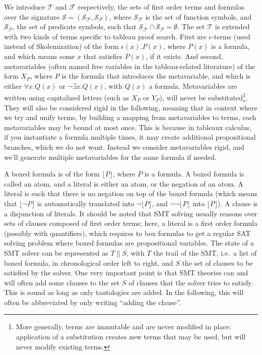 We introduce $\mathcal{T}$ and $\mathcal{F}$ respectively, the sets of first
order terms and formulas over the signature
$\mathcal{S}=(\mathcal{S}_\mathcal{F},\mathcal{S}_\mathcal{P})$, where
$\mathcal{S}_\mathcal{F}$ is the set of function symbols, and
$\mathcal{S}_\mathcal{P}$, the set of predicate symbols, such that
$\mathcal{S}_\mathcal{F}\cap\mathcal{S}_\mathcal{P}=\emptyset$. The set
$\mathcal{T}$ is extended with two kinds of terms specific to tableau proof
search. First are $\epsilon{}$-terms (used instead of Skolemization) of the form
$\epsilon(x).P(x)$, where $P(x)$ is a formula, and which means some $x$ that
satisfies $P(x)$, if it exists. And second, metavariables (often named free
variables in the tableau-related literature) of the form $X_P$, where $P$ is the
formula that introduces the metavariable, and which is either $\forall{}x.Q(x)$
or $\neg\exists{}x.Q(x)$, with $Q(x)$ a formula. Metavariables are written using
capitalized letters (such as $X_P$ or $Y_P$), will never be
substituted\footnote{More generally, terms are immutable and are never modified
in place: application of a substitution creates new terms that may be used,
but will never modify existing terms.}. They will also be considered rigid in
the following, meaning that in context where we try and unify terms, by building
a mapping from metavariables to terms, each metavariables may be bound at most
once.  This is because in tableaux calculus, if you instantiate a formula
multiple times, it may create additional propositional branches, which we do not
want. Instead we consider metavariables rigid, and we'll generate multiple
metavariables for the same formula if needed.

A boxed formula is of the form $\lfloor{}P\rfloor$, where $P$ is a formula. A
boxed formula is called an atom, and a literal is either an atom, or the
negation of an atom. A literal is such that there is no negation on top of the
boxed formula (which means that $\lfloor\neg{}P\rfloor$ is automatically
translated into $\neg\lfloor{}P\rfloor$, and $\neg\neg\lfloor{}P\rfloor$ into
$\lfloor{}P\rfloor$).  A clause is a disjunction of literals. It should be noted
that SMT solving usually reasons over sets of clauses composed of first order
terms; here, a literal is a first order formula (possibly with quantifiers),
which requires to box formulas to get a regular SAT solving problem where boxed
formulas are propositional variables.  The state of a SMT solver can be
represented as $T \parallel S$, with $T$ the trail of the SMT, i.e.~a list of
boxed formula, in chronological order left to right, and $S$ the set of clauses
to be satisfied by the solver. One very important point is that SMT theories can
and will often add some clauses to the set $S$ of clauses that the solver tries
to satisfy. This is sound as long as only tautologies are added. In the
following, this will often be abbreviated by only writing ``adding the clause''.

